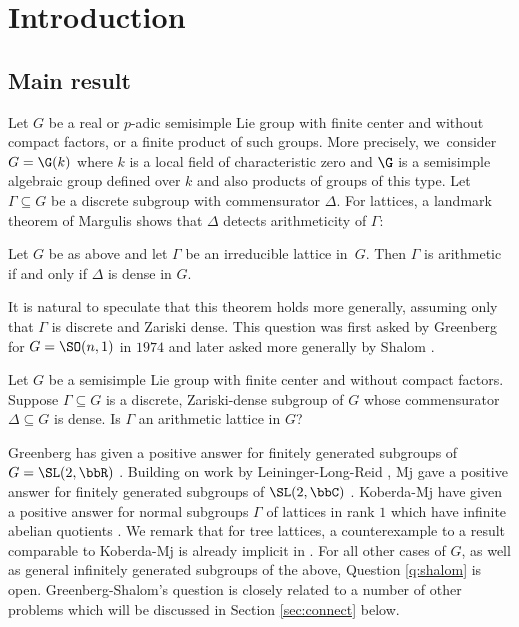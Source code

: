 \section{Introduction}
\label{sec:intro}

\subsection{Main result}\label{sec:mainthm} Let $G$ be a real or $p$-adic semisimple Lie group with finite center and without compact factors, or a finite product of such groups. More precisely, we~consider $G=\G(k)$ where $k$ is a local field of characteristic zero and $\G$ is a semisimple algebraic group defined over $k$ and also products of groups of this type. Let $\Gamma\subseteq G$ be a discrete subgroup with commensurator $\Delta$. For lattices, a landmark theorem of Margulis shows that $\Delta$ detects arithmeticity of $\Gamma$:
\begin{thm}[Margulis]\label{thm:margulis-comm}
Let $G$ be as above and let $\Gamma$ be an irreducible lattice in~$G$. Then $\Gamma$ is arithmetic if and only if $\Delta$ is dense in $G$.
\end{thm}
It is natural to speculate that this theorem holds more generally, assuming only that $\Gamma$ is discrete and Zariski dense. This question was first asked by Greenberg for $G=\SO(n,1)$ in $1974$ and later asked more generally by Shalom \cite{greenberg-comm, mj-comm}.

\begin{question}\label{q:shalom}
Let $G$ be a semisimple Lie group with finite center and without compact factors. Suppose $\Gamma\subseteq G$ is a discrete, Zariski-dense subgroup of $G$ whose commensurator $\Delta\subseteq G$ is dense. Is $\Gamma$ an arithmetic lattice in $G$?
\end{question}

Greenberg has given a positive answer for finitely generated subgroups of $G=\SL(2,\bbR)$ \cite{greenberg-comm}. Building on work by Leininger-Long-Reid \cite{llr-comm}, Mj gave a positive answer for finitely generated subgroups of $\SL(2,\bbC)$ \cite{mj-comm}. Koberda-Mj have given a positive answer for normal subgroups $\Gamma$ of lattices in rank $1$ which have infinite abelian quotients \cite{koberda-mj0,koberda-mj}. We remark that for tree lattices, a counterexample to a result comparable to Koberda-Mj is already implicit in \cite[Prop.\,8.1]{BurgerMozes}. For all other cases of $G$, as well as general infinitely generated subgroups of the above, Question \ref{q:shalom} is open. Greenberg-Shalom's question is closely related to a number of other problems which will be discussed in Section \ref{sec:connect} below.

